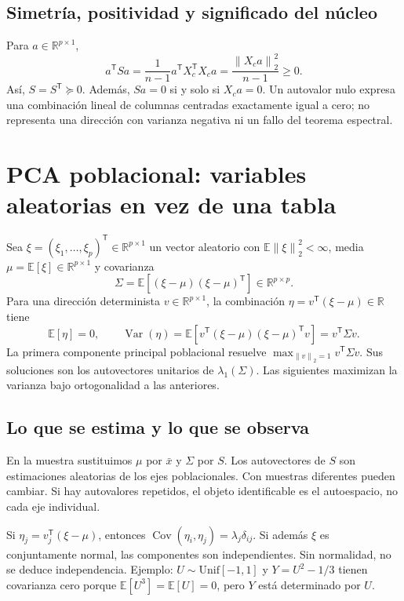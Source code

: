 \documentclass[11pt,a4paper]{article}
\newcommand{\R}{\mathbb R}
\newcommand{\E}{\mathbb E}
\newcommand{\T}{^{\mathsf T}}
\newcommand{\norm}[1]{\left\lVert #1\right\rVert}
\DeclareMathOperator{\Var}{Var}
\DeclareMathOperator{\Cov}{Cov}
\theoremstyle{definition}
\begin{document}
\subsection{Simetría, positividad y significado del núcleo}
Para $a\in\R^{p\times1}$,
\[
a\T Sa=\frac1{n-1}a\T X_c\T X_ca=\frac{\norm{X_ca}_2^2}{n-1}\ge0.
\]
Así, $S=S\T\succeq0$. Además, $Sa=0$ si y solo si $X_ca=0$. Un autovalor nulo expresa una combinación lineal de columnas centradas exactamente igual a cero; no representa una dirección con varianza negativa ni un fallo del teorema espectral.

\section{PCA poblacional: variables aleatorias en vez de una tabla}
Sea $\xi=(\xi_1,\ldots,\xi_p)\T\in\R^{p\times1}$ un vector aleatorio con $\E\norm\xi_2^2<\infty$, media $\mu=\E[\xi]\in\R^{p\times1}$ y covarianza
\[
\Sigma=\E[(\xi-\mu)(\xi-\mu)\T]\in\R^{p\times p}.
\]
Para una dirección determinista $v\in\R^{p\times1}$, la combinación $\eta=v\T(\xi-\mu)\in\R$ tiene
\[
\E[\eta]=0,\qquad \Var(\eta)=\E[v\T(\xi-\mu)(\xi-\mu)\T v]=v\T\Sigma v.
\]
La primera componente principal poblacional resuelve $\max_{\norm v_2=1}v\T\Sigma v$. Sus soluciones son los autovectores unitarios de $\lambda_1(\Sigma)$. Las siguientes maximizan la varianza bajo ortogonalidad a las anteriores.
\subsection{Lo que se estima y lo que se observa}
En la muestra sustituimos $\mu$ por $\bar x$ y $\Sigma$ por $S$. Los autovectores de $S$ son estimaciones aleatorias de los ejes poblacionales. Con muestras diferentes pueden cambiar. Si hay autovalores repetidos, el objeto identificable es el autoespacio, no cada eje individual.
\begin{cuidado}
Si $\eta_j=v_j\T(\xi-\mu)$, entonces $\Cov(\eta_i,\eta_j)=\lambda_j\delta_{ij}$. Si además $\xi$ es conjuntamente normal, las componentes son independientes. Sin normalidad, no se deduce independencia. Ejemplo: $U\sim\mathrm{Unif}[-1,1]$ y $Y=U^2-1/3$ tienen covarianza cero porque $\E[U^3]=\E[U]=0$, pero $Y$ está determinado por $U$.
\end{cuidado}
\end{document}
